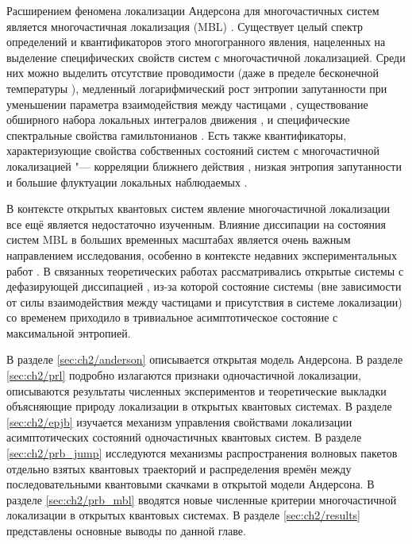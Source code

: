 Расширением феномена локализации Андерсона для многочастичных систем является многочастичная локализация (MBL) \cite{Basko2006, Gornyi2005}.
Существует целый спектр определений и квантификаторов этого многогранного явления, нацеленных на выделение специфических свойств систем с многочастичной локализацией.
Среди них можно выделить отсутствие проводимости \autocite{Gornyi2005} (даже в пределе бесконечной температуры \autocite{Basko2006}), медленный логарифмический рост энтропии запутанности при уменьшении параметра взаимодействия между частицами \autocite{Chiara2006, Znidaric2008, Bardarson2012, Serbyn2013_1}, существование обширного набора локальных интегралов движения \autocite{Serbyn2013_2}, и специфические спектральные свойства гамильтонианов \autocite{Oganesyan2007, Serbyn2016}.
Есть также квантификаторы, характеризующие свойства собственных состояний систем с многочастичной локализацией "--- корреляции ближнего действия \autocite{Pal2010}, низкая энтропия запутанности \autocite{Bauer2013, Kjll2014, Khemani2017} и большие флуктуации локальных наблюдаемых \autocite{Bera2015}.

В контексте открытых квантовых систем явление многочастичной локализации все ещё является недостаточно изученным. Влияние диссипации на состояния систем  MBL в больших временных масштабах является очень важным направлением исследования, особенно в контексте недавних экспериментальных работ \autocite{Schreiber2015, Choi2016, Bordia2017, Smith2016}. В связанных теоретических работах \autocite{Levi2016, Fischer2016, Medvedyeva2016} рассматривались открытые системы с дефазирующей диссипацией \autocite{Poletti2013}, из-за которой состояние системы (вне зависимости от силы взаимодействия между частицами и присутствия в системе локализации) со временем приходило в тривиальное асимптотическое состояние с максимальной энтропией.

В разделе \cref{sec:ch2/anderson} описывается открытая модель Андерсона.
В разделе \cref{sec:ch2/prl} подробно излагаются признаки одночастичной локализации, описываются результаты численных экспериментов и теоретические выкладки объясняющие природу локализации в открытых квантовых системах. 
В разделе \cref{sec:ch2/epjb} изучается механизм управления свойствами локализации асимптотических состояний одночастичных квантовых систем. 
В разделе \cref{sec:ch2/prb_jump} исследуются механизмы распространения волновых пакетов отдельно взятых квантовых траекторий и распределения времён между последовательными квантовыми скачками в открытой модели Андерсона.
В разделе \cref{sec:ch2/prb_mbl} вводятся новые численные критерии многочастичной локализации в открытых квантовых системах.
В разделе \cref{sec:ch2/results} представлены основные выводы по данной главе.

